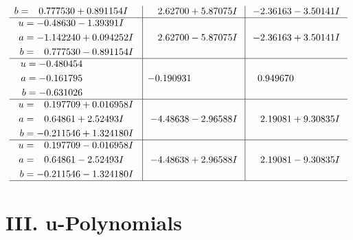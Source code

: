 \documentclass[1p]{elsarticle_modified}
\theoremstyle{definition}
\begin{document}
$$\begin{array}{c|c|c}
\begin{aligned}
b &= \phantom{-}0.777530 + 0.891154 I\end{aligned}
 & \phantom{-}2.62700 + 5.87075 I & -2.36163 - 3.50141 I \\ \hline\begin{aligned}
u &= -0.48630 - 1.39391 I \\
a &= -1.142240 + 0.094252 I \\
b &= \phantom{-}0.777530 - 0.891154 I\end{aligned}
 & \phantom{-}2.62700 - 5.87075 I & -2.36163 + 3.50141 I \\ \hline\begin{aligned}
u &= -0.480454\phantom{ +0.000000I} \\
a &= -0.161795\phantom{ +0.000000I} \\
b &= -0.631026\phantom{ +0.000000I}\end{aligned}
 & -0.190931\phantom{ +0.000000I} & \phantom{-}0.949670\phantom{ +0.000000I} \\ \hline\begin{aligned}
u &= \phantom{-}0.197709 + 0.016958 I \\
a &= \phantom{-}0.64861 + 2.52493 I \\
b &= -0.211546 + 1.324180 I\end{aligned}
 & -4.48638 - 2.96588 I & \phantom{-}2.19081 + 9.30835 I \\ \hline\begin{aligned}
u &= \phantom{-}0.197709 - 0.016958 I \\
a &= \phantom{-}0.64861 - 2.52493 I \\
b &= -0.211546 - 1.324180 I\end{aligned}
 & -4.48638 + 2.96588 I & \phantom{-}2.19081 - 9.30835 I\\
 \hline 
 \end{array}$$\newpage
\newpage\renewcommand{\arraystretch}{1}
\centering \section*{ III. u-Polynomials}
\end{document}
